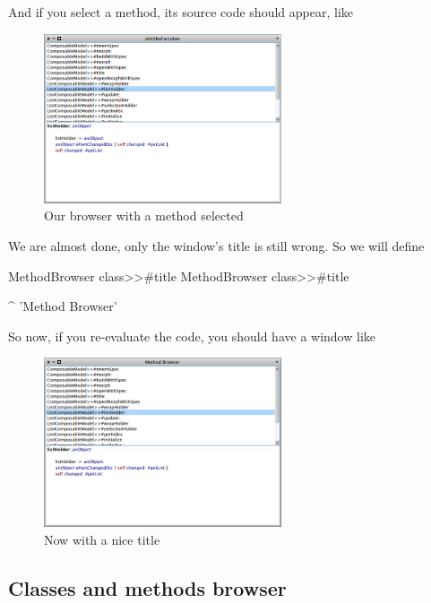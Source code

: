 \documentclass[a4paper,10pt,twoside]{book}
\begin{document}
\newpage
And if you select a method, its source code should appear, like 

\begin{figure}[ht]
\begin{center}
	\includegraphics[width=7cm]{MethodBrowser3}
	\caption{Our browser with a method selected}
\end{center}
\end{figure}

We are almost done, only the window's title is still wrong.
So we will define
\begin{method}{MethodBrowser class>>\#title}
MethodBrowser class>>#title

	^ 'Method Browser'
\end{method}

So now, if you re-evaluate the code, you should have a window like 

\begin{figure}[ht]
\begin{center}
	\includegraphics[width=7cm]{MethodBrowser4}
	\caption{Now with a nice title}
\end{center}
\end{figure}

\subsection{Classes and methods browser}
\end{document}
